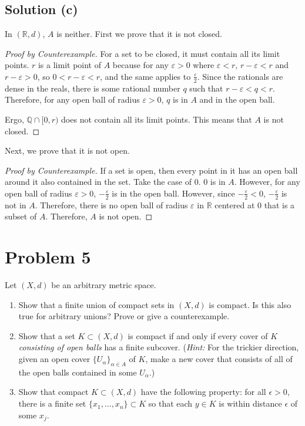 \documentclass[11pt]{article}
\begin{document}
    \subsection{Solution (c)}
        In $(\mathbb{R}, d)$, $A$ is neither.
        First we prove that it is not closed.
        \begin{proof}[Proof by Counterexample]
            For a set to be closed, it must contain all its limit points.
            $r$ is a limit point of $A$ because for any $\varepsilon > 0$ where $\varepsilon < r$, $r - \varepsilon < r$ and $r - \varepsilon > 0$, so $0 < r - \varepsilon < r$, and the same applies to $\frac{\varepsilon}{2}$.
            Since the rationals are dense in the reals, there is some rational number $q$ such that $r - \varepsilon < q < r$.
            Therefore, for any open ball of radius $\varepsilon > 0$, $q$ is in $A$ and in the open ball.

            Ergo, $\mathbb{Q} \cap [0,r)$ does not contain all its limit points.
            This means that $A$ is not closed.
        \end{proof}

        Next, we prove that it is not open.
        \begin{proof}[Proof by Counterexample]
            If a set is open, then every point in it has an open ball around it also contained in the set.
            Take the case of $0$.
            $0$ is in $A$.
            However, for any open ball of radius $\varepsilon > 0$, $-\frac{\varepsilon}{2}$ is in the open ball.
            However, since $-\frac{\varepsilon}{2} < 0$, $-\frac{\varepsilon}{2}$ is not in $A$.
            Therefore, there is no open ball of radius $\varepsilon$ in $\mathbb{R}$ centered at $0$ that is a subset of $A$.
            Therefore, $A$ is not open.
        \end{proof}
    \pagebreak

\section{Problem 5}
    Let $(X, d)$ be an arbitrary metric space.
    \begin{enumerate}[label=(\alph*)]
        \item 
        Show that a finite union of compact sets in $(X, d)$ is compact. Is this also true for arbitrary unions? Prove or give a counterexample.

        \item 
        Show that a set $K \subset (X, d)$ is compact if and only if every cover of $K$ \textit{consisting of open balls} has a finite subcover. (\textit{Hint:} For the trickier direction, given an open cover $\{U_\alpha\}_{\alpha \in A}$ of $K$, make a new cover that consists of all of the open balls contained in some $U_\alpha$.)

        \item 
        Show that compact $K \subset (X, d)$ have the following property: for all $\epsilon > 0$, there is a finite set $\{x_1, \dots, x_n\} \subset K$ so that each $y \in K$ is within distance $\epsilon$ of some $x_j$.
        
    \end{enumerate}
    
\end{document}
